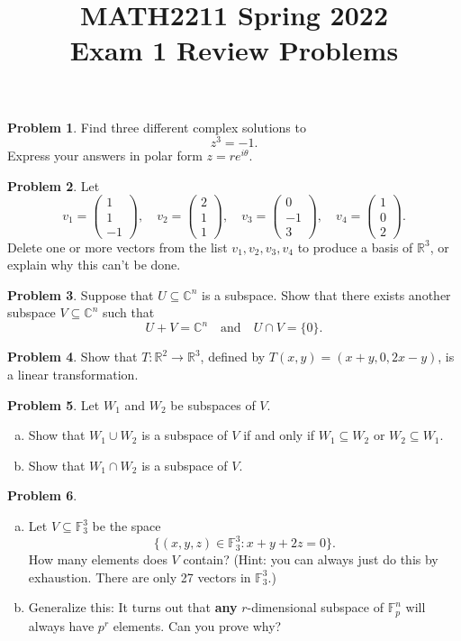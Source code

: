 \documentclass[11pt,oneside]{amsart}
\title{MATH2211 Spring 2022\\
Exam 1 Review Problems}
\author{}
\theoremstyle{definition}
\newtheorem{problem}{Problem}
\newcommand{\bC}{\mathbb{C}}
\newcommand{\bF}{\mathbb{F}}
\newcommand{\bR}{\mathbb{R}}
\newcommand*\dcolvec[1]{\begin{pmatrix}#1\end{pmatrix}}
\begin{document}
    \maketitle

    \begin{problem}
        Find three different complex solutions to
        \[z^3=-1.\]
        Express your answers in polar form $z=re^{i\theta}$.
    \end{problem}

    \begin{problem}
        Let
        \[v_1=\dcolvec{1\\1\\-1},\quad v_2=\dcolvec{2\\1\\1},\quad v_3=\dcolvec{0\\-1\\3},\quad v_4=\dcolvec{1\\0\\2}.\]
        Delete one or more vectors from the list $v_1,v_2,v_3,v_4$ to produce a basis of $\bR^3$, or explain why this can't be done.
    \end{problem}

    \begin{problem}
        Suppose that $U\subseteq \bC^n$ is a subspace. Show that there exists another subspace $V\subseteq\bC^n$ such that
        \[U+V=\bC^n\quad\text{and}\quad U\cap V=\{0\}.\]
    \end{problem}

    \begin{problem}
        Show that $T\colon\bR^2\to\bR^3$, defined by $T(x,y)=(x+y,0,2x-y)$, is a linear transformation.
    \end{problem}

    \begin{problem}
        Let $W_1$ and $W_2$ be subspaces of $V$.
        \begin{enumerate}[(a)]
            \item Show that $W_1\cup W_2$ is a subspace of $V$ if and only if $W_1\subseteq W_2$ or $W_2\subseteq W_1$.
            \item Show that $W_1\cap W_2$ is a subspace of $V$.
        \end{enumerate}
    \end{problem}

    \begin{problem}
        \leavevmode\begin{enumerate}[(a)]
            \item Let $V\subseteq \bF_3^3$ be the space
            \[\{(x,y,z)\in\bF_3^3:x+y+2z=0\}.\]
            How many elements does $V$ contain? (Hint: you can always just do this by exhaustion. There are only 27 vectors in $\bF_3^3$.)
            \item Generalize this: It turns out that \textbf{any} $r$-dimensional subspace of $\bF_p^n$ will always have $p^r$ elements. Can you prove why?
        \end{enumerate}
    \end{problem}
\end{document}
